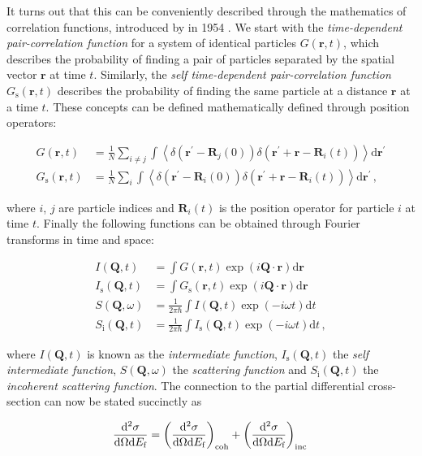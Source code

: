 It turns out that this can be conveniently described through the mathematics of correlation functions, introduced by \citeauthor{VanHove1954} in 1954 \cite{VanHove1954}. We start with the \emph{time-dependent pair-correlation function} for a system of identical particles $G(\bm{r}, t)$, which describes the probability of finding a pair of particles separated by the spatial vector $\bm{r}$ at time $t$. Similarly, the \emph{self time-dependent pair-correlation function} $G_\text{s}(\bm{r}, t)$ describes the probability of finding the same particle at a distance $\bm{r}$ at a time $t$. These concepts can be defined mathematically defined through position operators:


\begin{align*}
	G(\bm{r}, t) &= \frac{1}{N} \sum_{i \neq j} \int \left\langle  \delta (\bm{r}^\prime - \bm{R}_j(0) ) \delta (\bm{r}^\prime + \bm{r} - \bm{R}_i(t)) \right\rangle \mathrm{d}\bm{r}^\prime \\
	G_\text{s}(\bm{r}, t) &= \frac{1}{N} \sum_{i} \int \left\langle  \delta (\bm{r}^\prime - \bm{R}_i(0) ) \delta (\bm{r}^\prime + \bm{r} - \bm{R}_i(t)) \right\rangle \mathrm{d}\bm{r}^\prime \, ,
\end{align*}

\noindent where $i$, $j$ are particle indices and $\bm{R}_i(t)$ is the position operator for particle $i$ at time $t$. Finally the following functions can be obtained through Fourier transforms in time and space:

\begin{align*}
	I(\bm{Q}, t) &= \int G(\bm{r},t) \exp (i \bm{Q} \cdot \bm{r} ) \mathrm{d}\bm{r} \\
	I_\text{s}(\bm{Q}, t) &= \int G_\text{s}(\bm{r},t) \exp (i \bm{Q} \cdot \bm{r} ) \mathrm{d}\bm{r} \\
	S(\bm{Q}, \omega) &= \frac{1}{2 \pi \hbar} \int I(\bm{Q}, t) \exp (-i \omega t) \mathrm{d}t \, \\
	S_\text{i}(\bm{Q}, t) &= \frac{1}{2 \pi \hbar} \int I_\text{s}(\bm{Q}, t) \exp (-i \omega t) \mathrm{d}t \, ,
\end{align*}

\noindent where $I(\bm{Q}, t)$ is known as the \emph{intermediate function}, $I_\text{s}(\bm{Q}, t)$ the \emph{self intermediate function}, $S(\bm{Q}, \omega)$ the \emph{scattering function} and $S_\text{i}(\bm{Q}, t)$ the \emph{incoherent scattering function}. The connection to the partial differential cross-section can now be stated succinctly as

\begin{equation}
	\frac{\mathrm{d}^2\sigma}{\mathrm{d}\Omega\mathrm{d}E_\text{f}} = \left( \frac{\mathrm{d}^2\sigma}{\mathrm{d}\Omega\mathrm{d}E_\text{f}} \right)_\text{coh} + \left( \frac{\mathrm{d}^2\sigma}{\mathrm{d}\Omega\mathrm{d}E_\text{f}} \right)_\text{inc} \\
\end{equation}

